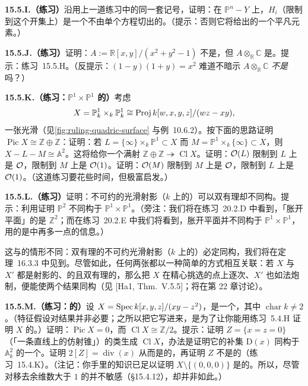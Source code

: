 \textbf{15.5.I.（练习）}\quad 沿用上一道练习中的同一套记号，证明：在 $\mathbb{P}^n-Y$ 上，$H_i$（限制到这个开集上）是一个不由单个方程切出的\trEffectiveCartierDivisor。（提示：否则它将给出\trClassGroup{}的一个平凡元素。）

\textbf{15.5.J.（练习）}\quad 证明：$A:=\mathbb{R}[x,y]/(x^2+y^2-1)$ 不是\trUFD，但 $A\otimes_{\mathbb{R}}\mathbb{C}$ 是。提示：\mbox{练习~15.5.H}。（反提示：$(1-y)(1+y)=x^2$ 难道不暗示 $A\otimes_{\mathbb{R}}\mathbb{C}$ \emph{不是}\trUFD{}吗？）

\textbf{15.5.K.（练习：$\mathbb{P}^1\times\mathbb{P}^1$ 的\trPicardGroup）}\quad 考虑
\[
X=\mathbb{P}^1_k\times_k\mathbb{P}^1_k\cong\operatorname{Proj} k[w,x,y,z]/(wz-xy),
\]
一张光滑\trQuadricSurface（见\cref{fig:ruling-quadric-surface} 与\mbox{例~10.6.2}）。按下面的思路证明 $\operatorname{Pic}X\cong\mathbb{Z}\oplus\mathbb{Z}$：证明：若 $L=\{\infty\}\times_k\mathbb{P}^1\subset X$ 而 $M=\mathbb{P}^1\times_k\{\infty\}\subset X$，则 $X-L-M\cong\mathbb{A}^2$。这将给你一个满射 $\mathbb{Z}\oplus\mathbb{Z}\twoheadrightarrow\operatorname{Cl}X$。证明：$\mathcal{O}(L)$ 限制到 $L$ 上是 $\mathcal{O}$，限制到 $M$ 上是 $\mathcal{O}(1)$。证明：$\mathcal{O}(M)$ 限制到 $M$ 上是 $\mathcal{O}$，限制到 $L$ 上是 $\mathcal{O}(1)$。（这道练习要花些时间，但极富启发。）

\textbf{15.5.L.（练习）}\quad 证明：不可约的光滑射影\trSurface（$k$ 上的）可以双有理却不同构。提示：利用\trPicardGroup{}证明 $\mathbb{P}^2$ 不同构于 $\mathbb{P}^1\times\mathbb{P}^1$。（旁注：我们将在\mbox{练习~20.2.D} 中看到，「胀开平面」的\trPicardGroup{}是 $\mathbb{Z}^2$；而在\mbox{练习~20.2.E} 中我们将看到，胀开平面并不同构于 $\mathbb{P}^1\times\mathbb{P}^1$，用的是\trPicardGroup{}中再多一点的信息。）

这与\trCurve{}的情形不同：双有理的不可约光滑射影\trCurve（$k$ 上的）必定同构，我们将在\mbox{定理~16.3.3} 中见到。尽管如此，任何两张\trSurface{}都以一种简单的方式相互关联：若 $X$ 与 $X'$ 都是射影的、\trRegular{}的且双有理的，那么把 $X$ 在精心挑选的点上逐次\trBlowup、$X'$ 也如法炮制，便能使两个结果同构（见 [Ha1, Thm.~V.5.5]；\trBlowup{}将在第 22 章讨论）。

\textbf{15.5.M.（练习：\trCone{}的\trPicardGroup）}\quad 设 $X=\operatorname{Spec} k[x,y,z]/(xy-z^2)$，是一个\trCone，其中 $\operatorname{char}k\ne 2$。（特征假设对结果并非必要；之所以把它写进来，是为了让你能用\mbox{练习~5.4.H} 证明 $X$ 的\trNormality。）证明：$\operatorname{Pic}X=0$，而 $\operatorname{Cl}X\cong\mathbb{Z}/2$。提示：证明 $Z=\{x=z=0\}$（「一条直线上的仿射锥」）的类生成 $\operatorname{Cl}X$，办法是证明它的补集 $\mathrm{D}(x)$ 同构于 $\mathbb{A}^2_k$ 的一个\trOpenSubset。证明 $2[Z]=\operatorname{div}(x)$ 从而是\trPrincipal{}的，再证明 $Z$ 不是\trPrincipal{}的（\mbox{练习~15.4.K}）。（注记：你手里的知识已足以证明 $X\setminus\{(0,0,0)\}$ 是\trFactorial{}的。所以，尽管\trClassGroup{}对移去余维数大于 $1$ 的\trLocus{}并不敏感（\S15.4.12），\trPicardGroup{}却并非如此。）


